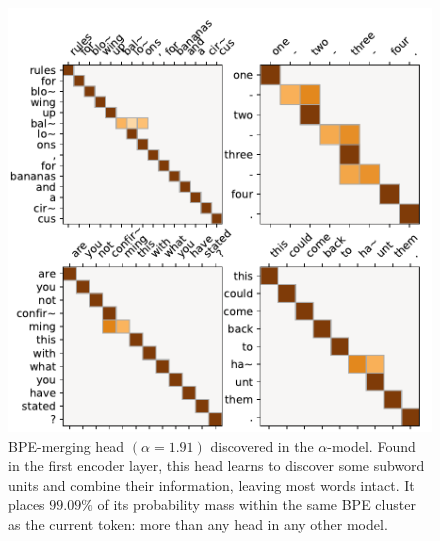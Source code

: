 \begin{figure}[htbp]
    \centering
    \includegraphics[width=0.95\columnwidth]{Figures/head_bpe}
    \caption[BPE-merging head $(\alpha=1.91)$ discovered in the
        $\alpha$-\entmaxtext model.]{%
        BPE-merging head $(\alpha=1.91)$ discovered in the
        $\alpha$-\entmaxtext model. Found in the first encoder layer,
        this head learns to discover some subword units and combine their
        information, leaving most words intact. It places $99.09\%$ of
        its probability mass within the same BPE cluster as the current
        token: more than any head in any other model.}
    \label{fig:head_bpe}
\end{figure}

